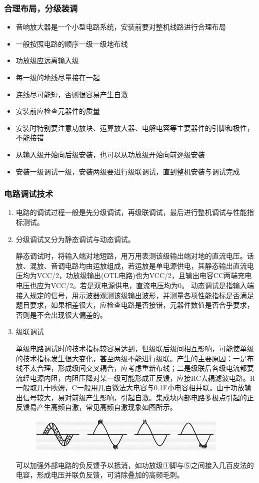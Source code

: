 \documentclass[a4paper,11pt,UTF8]{article}
\numberwithin{equation}{subsection}
\begin{document}
\subsubsection{合理布局，分级装调}
\begin{itemize}
	\setlength{\itemsep}{0pt}
	\item 音响放大器是一个小型电路系统，安装前要对整机线路进行合理布局
	\item 一般按照电路的顺序一级一级地布线
	\item 功放级应远离输入级
	\item 每一级的地线尽量接在一起
	\item 连线尽可能短，否则很容易产生自激
	\item 安装前应检查元器件的质量
	\item 安装时特别要注意功放块、运算放大器、电解电容等主要器件的引脚和极性，不能接错
	\item 从输入级开始向后级安装，也可以从功放级开始向前逐级安装
	\item 安装一级调试一级，安装两级要进行级联调试，直到整机安装与调试完成
\end{itemize}
\subsubsection{电路调试技术}
\begin{enumerate}
	\setlength{\itemsep}{0pt}
	\item 电路的调试过程一般是先分级调试，再级联调试，最后进行整机调试与性能指标测试。
	\item 分级调试又分为静态调试与动态调试。
	
	静态调试时，将输入端对地短路，用万用表测该级输出端对地的直流电压。话放、混放、音调电路均由运放组成，若运放是单电源供电，其静态输出直流电压均为\newline VCC/2，功放级输出(OTL电路)也为VCC/2，且输出电容CC两端充电电压也应为\newline VCC/2。若是双电源供电，直流电压均为0。
	动态调试是指输入端接入规定的信号，用示波器观测该级输出波形，并测量各项性能指标是否满足题目要求，如果相差很大，应检查电路是否接错，元器件数值是否合乎要求，否则是不会出现很大偏差的。
	\item 级联调试
	
	单级电路调试时的技术指标较容易达到，但级联后级间相互影响，可能使单级的技术指标发生很大变化，甚至两级不能进行级联。产生的主要原因：一是布线不太合理，形成级间交叉耦合，应考虑重新布线；二是级联后各级电流都要流经电源内阻，内阻压降对某一级可能形成正反馈，应接RC去耦滤波电路。R一般取几十欧姆，C一般用几百微法大电容与0.1F小电容相并联。由于功放输出信号较大，易对前级产生影响，引起自激。集成块内部电路多极点引起的正反馈易产生高频自激，常见高频自激现象如图所示。
	\begin{figure}[H]
		\centering
		\includegraphics[width=0.9\textwidth]{2.png}
	\end{figure}
	可以加强外部电路的负反馈予以抵消，如功放级①脚与⑤之间接入几百皮法的电容，形成电压并联负反馈，可消除叠加的高频毛刺。
	
\end{enumerate}
\end{document}
